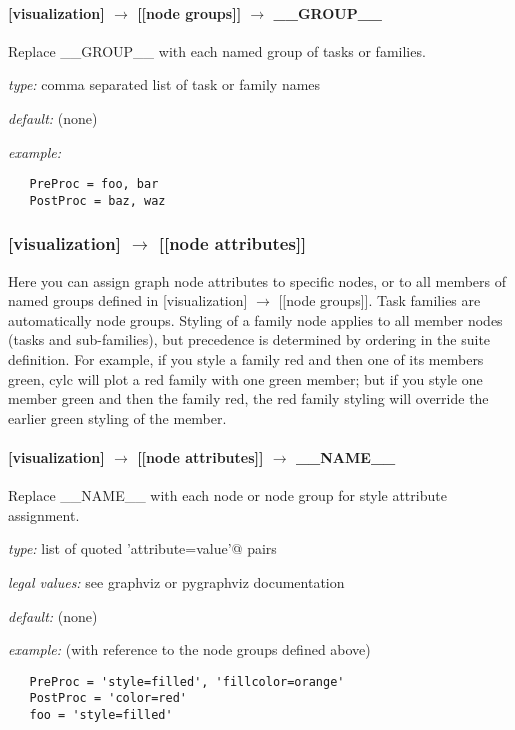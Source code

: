 \paragraph[\_\_GROUP\_\_]{[visualization] $\rightarrow$ [[node groups]] $\rightarrow$ \_\_GROUP\_\_}

Replace \_\_GROUP\_\_ with each named group of tasks or families.

\begin{myitemize}
    \item {\em type:} comma separated list of task or family names
    \item {\em default:} (none)
    \item {\em example:}
\begin{lstlisting}
   PreProc = foo, bar
   PostProc = baz, waz
\end{lstlisting}
\end{myitemize}

\subsubsection[{[[}node attributes{]]}]{[visualization] $\rightarrow$ [[node attributes]]}

Here you can assign graph node attributes to specific nodes, or to all
members of named groups defined in [visualization] $\rightarrow$ [[node
groups]]. Task families are automatically node groups. Styling of a
family node applies to all member nodes (tasks and sub-families), but
precedence is determined by ordering in the suite definition.  For
example, if you style a family red and then one of its members green,
cylc will plot a red family with one green member; but if you style one
member green and then the family red, the red family styling will
override the earlier green styling of the member.

\paragraph[\_\_NAME\_\_]{[visualization] $\rightarrow$ [[node attributes]] $\rightarrow$ \_\_NAME\_\_}

Replace \_\_NAME\_\_ with each node or node group for style attribute
assignment.

\begin{myitemize}
    \item {\em type:} list of quoted \lstinline@'attribute=value'@ pairs
    \item {\em legal values:} see graphviz or pygraphviz documentation
    \item {\em default:} (none)
    \item {\em example:} (with reference to the node groups defined above)
\begin{lstlisting}
   PreProc = 'style=filled', 'fillcolor=orange'
   PostProc = 'color=red'
   foo = 'style=filled'
\end{lstlisting}
\end{myitemize}


